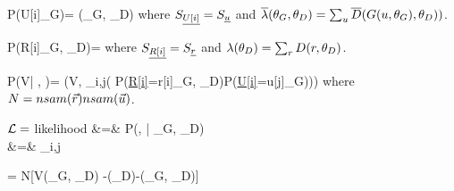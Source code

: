 \beq\color{blue}
P(U[i]\cond \theta_G)= 
{\ol{\lam}(\theta_G, \theta_D)}
\eeq
where  $S_{\underline{U[i]}}=S_{\underline{u}}$ and $\overline{\lambda}(\theta_G, \theta_D)=\sum_u\overline{D}(G(u, \theta_G), \theta_D))$.

\beq\color{blue}
P(R[i]\cond \theta_G, \theta_D)= 
\eeq
where $S_{\underline{R[i]}}=S_{\underline{r}}$ and  $\lambda(\theta_D)=\sum_r D(r, \theta_D)$.


\beq\color{blue}
P(V| \vecu,  \vecr)=
\delta(V, \ln \prod_{i,j}(
P(\ul{R[i]}=r[i]\cond \theta_G, \theta_D)P(\ul{U[i]}=u[j]\cond \theta_G)))
\eeq
where $N=nsam({\vec{r}})nsam({\vec{u}})$.


${\cal L}=$ likelihood
\beqa
\call&=&
P(\vecr, \vecu| \theta_G, \theta_D)\\
&=&
\prod_{i,j}
\eeqa

\beq
\ln \call = N[V(\theta_G, \theta_D)
-\ln \lam(\theta_D)-\ln \ol{\lam}(\theta_G, \theta_D)]
\eeq





 